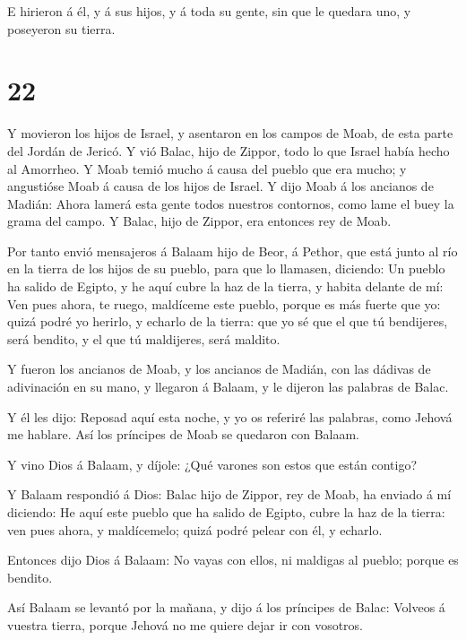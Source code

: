  E hirieron á él, y á sus hijos, y á toda su gente, sin que
le quedara uno, y poseyeron su tierra.

\hypertarget{section-21}{%
\section{22}\label{section-21}}

 Y movieron los hijos de Israel, y asentaron en los campos
de Moab, de esta parte del Jordán de Jericó.  Y vió Balac,
hijo de Zippor, todo lo que Israel había hecho al Amorrheo. 
Y Moab temió mucho á causa del pueblo que era mucho; y angustióse Moab á
causa de los hijos de Israel.  Y dijo Moab á los ancianos de
Madián: Ahora lamerá esta gente todos nuestros contornos, como lame el
buey la grama del campo. Y Balac, hijo de Zippor, era entonces rey de
Moab.

 Por tanto envió mensajeros á Balaam hijo de Beor, á Pethor,
que está junto al río en la tierra de los hijos de su pueblo, para que
lo llamasen, diciendo: Un pueblo ha salido de Egipto, y he aquí cubre la
haz de la tierra, y habita delante de mí:  Ven pues ahora,
te ruego, maldíceme este pueblo, porque es más fuerte que yo: quizá
podré yo herirlo, y echarlo de la tierra: que yo sé que el que tú
bendijeres, será bendito, y el que tú maldijeres, será maldito.

 Y fueron los ancianos de Moab, y los ancianos de Madián,
con las dádivas de adivinación en su mano, y llegaron á Balaam, y le
dijeron las palabras de Balac.

 Y él les dijo: Reposad aquí esta noche, y yo os referiré
las palabras, como Jehová me hablare. Así los príncipes de Moab se
quedaron con Balaam.

 Y vino Dios á Balaam, y díjole: ¿Qué varones son estos que
están contigo?

 Y Balaam respondió á Dios: Balac hijo de Zippor, rey de
Moab, ha enviado á mí diciendo:  He aquí este pueblo que ha
salido de Egipto, cubre la haz de la tierra: ven pues ahora, y
maldícemelo; quizá podré pelear con él, y echarlo.

 Entonces dijo Dios á Balaam: No vayas con ellos, ni
maldigas al pueblo; porque es bendito.

 Así Balaam se levantó por la mañana, y dijo á los
príncipes de Balac: Volveos á vuestra tierra, porque Jehová no me quiere
dejar ir con vosotros.

